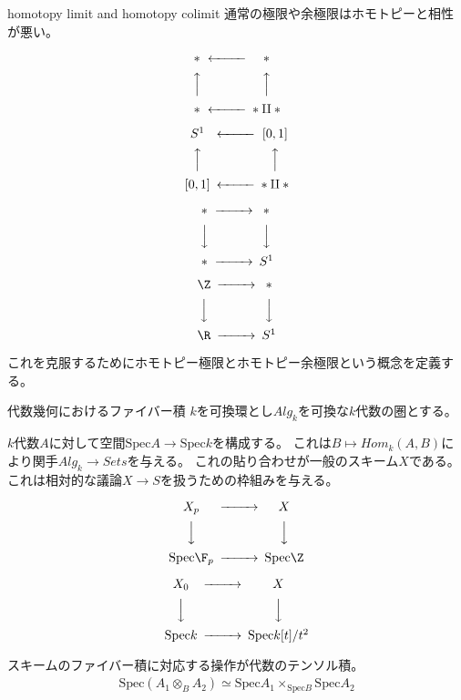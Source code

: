 \documentclass[dvipdfmx]{beamer}
\newcommand{\spec}{\mathrm{Spec}}
\begin{document}
\begin{frame}{homotopy limit and homotopy colimit}
通常の極限や余極限はホモトピーと相性が悪い。

\begin{multicols}{2}
\[
\begin{CD}
\ast@<<<\ast\\
@AAA@AAA\\
\ast@<<<\ast\amalg\ast
\end{CD}
\]

\[
\begin{CD}
S^1@<<<[0,1]\\
@AAA@AAA\\
[0,1]@<<<\ast\amalg\ast
\end{CD}
\]
\end{multicols}


\begin{multicols}{2}
\[
\begin{CD}
\ast@>>>\ast\\
@VVV@VVV\\
\ast@>>>S^1
\end{CD}
\]

\[
\begin{CD}
\Z@>>>\ast\\
@VVV@VVV\\
\R@>>>S^1
\end{CD}
\]
\end{multicols}

これを克服するためにホモトピー極限とホモトピー余極限という概念を定義する。
\end{frame}

\begin{frame}{代数幾何におけるファイバー積}
$k$を可換環とし$Alg_k$を可換な$k$代数の圏とする。

$k$代数$A$に対して空間$\spec A \to \spec k$を構成する。
これは$B \mapsto Hom_{k}(A,B)$により関手$Alg_k \to Sets$を与える。
これの貼り合わせが一般のスキーム$X$である。
これは相対的な議論$X\to S$を扱うための枠組みを与える。
\begin{multicols}{2}
\[
\begin{CD}
X_p@>>>X\\
@VVV@VVV\\
\spec\F_p@>>>\spec\Z
\end{CD}
\]

\[
\begin{CD}
X_0@>>>X\\
@VVV@VVV\\
\spec k@>>>\spec k[t]/t^2
\end{CD}
\]
\end{multicols}

スキームのファイバー積に対応する操作が代数のテンソル積。
\begin{align*}
\spec(A_1\otimes_BA_2)\simeq \spec A_1\times_{\spec B}\spec A_2
\end{align*}
\end{frame}
\end{document}
